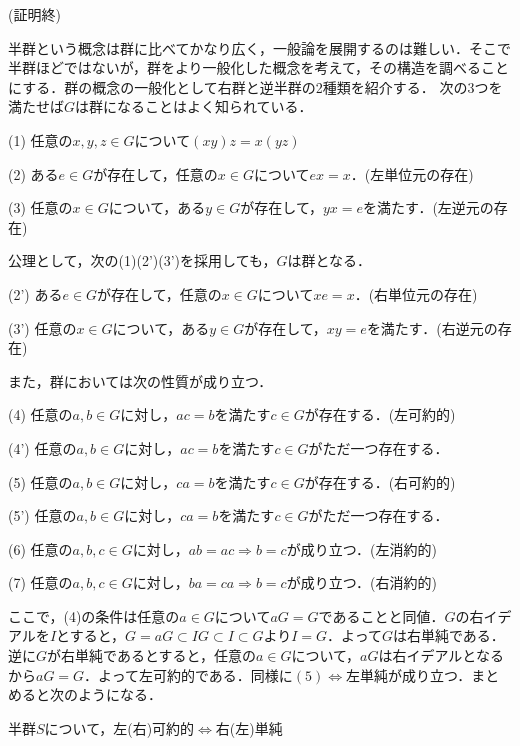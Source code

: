 \begin{flushright}
(証明終)
\end{flushright}
半群という概念は群に比べてかなり広く，一般論を展開するのは難しい．そこで半群ほどではないが，群をより一般化した概念を考えて，その構造を調べることにする．群の概念の一般化として右群と逆半群の2種類を紹介する．
次の3つを満たせば$G$は群になることはよく知られている．
\begin{description}
\item{(1)} 任意の$x,y,z\in G$について$(xy)z=x(yz)$
\item{(2)} ある$e\in G$が存在して，任意の$x\in G$について$ex=x$．(左単位元の存在)
\item{(3)} 任意の$x\in G$について，ある$y\in G$が存在して，$yx=e$を満たす．(左逆元の存在)
\end{description}
公理として，次の(1)(2')(3')を採用しても，$G$は群となる．
\begin{description}
\item{(2')} ある$e\in G$が存在して，任意の$x\in G$について$xe=x$．(右単位元の存在)
\item{(3')} 任意の$x\in G$について，ある$y\in G$が存在して，$xy=e$を満たす．(右逆元の存在)
\end{description}
また，群においては次の性質が成り立つ．
\begin{description}
\item{(4)} 任意の$a,b\in G$に対し，$ac=b$を満たす$c\in G$が存在する．(左可約的)
\item{(4')} 任意の$a,b\in G$に対し，$ac=b$を満たす$c\in G$がただ一つ存在する．
\item{(5)} 任意の$a,b\in G$に対し，$ca=b$を満たす$c\in G$が存在する．(右可約的)
\item{(5')} 任意の$a,b\in G$に対し，$ca=b$を満たす$c\in G$がただ一つ存在する．
\item{(6)} 任意の$a,b,c\in G$に対し，$ab=ac\Rightarrow b=c$が成り立つ．(左消約的)
\item{(7)} 任意の$a,b,c\in G$に対し，$ba=ca\Rightarrow b=c$が成り立つ．(右消約的)
\end{description}
ここで，(4)の条件は任意の$a\in G$について$aG=G$であることと同値．$G$の右イデアルを$I$とすると，$G=aG\subset IG\subset I\subset G$より$I=G$．よって$G$は右単純である．逆に$G$が右単純であるとすると，任意の$a\in G$について，$aG$は右イデアルとなるから$aG=G$．よって左可約的である．同様に$(5)\Longleftrightarrow$左単純が成り立つ．まとめると次のようになる．
\begin{sprop}
半群$S$について，左(右)可約的$\Longleftrightarrow$右(左)単純
\end{sprop}
